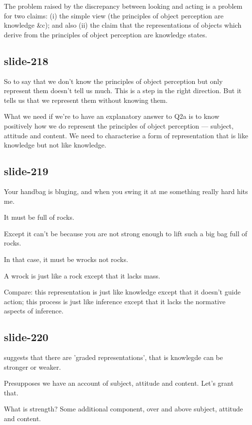 \documentclass[12pt,\papersize]{extarticle}
\begin{document}
The problem raised by the discrepancy between looking and acting is a problem for two claims: (i) the simple view (the principles of object perception are knowledge \&c); and also (ii) the claim that the representations of objects which derive from the principles of object perception are knowledge states.
 
\subsection{slide-218}
So to say that we don't know the principles of object perception but only represent them doesn't tell us much.
This is a step in the right direction.
But it tells us that we represent them without knowing them.
 
What we need if we're to have an explanatory answer to Q2a is to know positively how we do represent the principles of object perception --- subject, attitude and content.
We need to characterise a form of representation that is like knowledge but not like knowledge.
 
\subsection{slide-219}
Your handbag is bluging, and when you swing it at me something really hard hits me.
 
It must be full of rocks.
 
Except it can't be because you are not strong enough to lift such a big bag full of rocks.
 
In that case, it must be wrocks not rocks.
 
A wrock is just like a rock except that it lacks mass.
 
Compare: this representation is just like knowledge except that it doesn't guide action; this process is just like inference except that it lacks the normative aspects of inference.
 
\subsection{slide-220}
\citet{Munakata:2001ch} suggests that there are 'graded representations', that is knowlegde can be stronger or weaker.
 
Presupposes we have an account of subject, attitude and content.  Let's grant that.
 
What is strength?  Some additional component, over and above subject, attitude and content.
 
\end{document}
